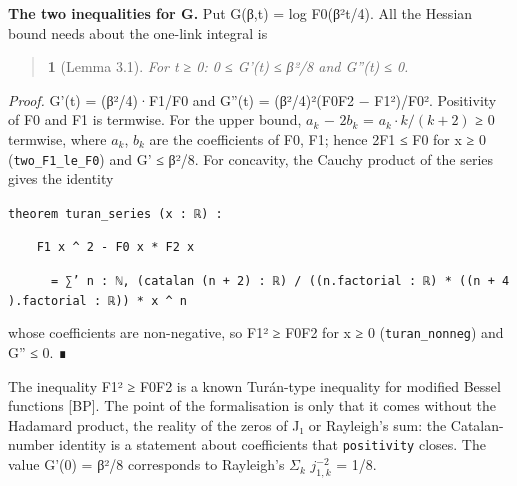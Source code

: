 \documentclass[11pt,a4paper]{article}
\theoremstyle{named}
\newtheorem*{namedthm}{}
\begin{document}
\textbf{The two inequalities for G.} Put G(β,t) = log F0(β²t/4). All the Hessian bound needs about the one-link integral is

\begin{quote}
\begin{namedthm}[Lemma 3.1]
For t ≥ 0: 0 ≤ G'(t) ≤ β²/8 and G''(t) ≤ 0.
\end{namedthm}
\end{quote}
\textit{Proof.} G'(t) = (β²/4)·F1/F0 and G''(t) = (β²/4)²(F0F2 − F1²)/F0². Positivity of F0 and F1 is termwise. For the upper bound, $a_k$ − $2b_k$ = $a_k·k/(k+2)$ ≥ 0 termwise, where $a_k$, $b_k$ are the coefficients of F0, F1; hence 2F1 ≤ F0 for x ≥ 0 (\texttt{two\_\allowbreak{}F1\_\allowbreak{}le\_\allowbreak{}F0}) and G' ≤ β²/8. For concavity, the Cauchy product of the series gives the identity

\begin{leancode}
\item \texttt{theorem\ \allowbreak{}turan\_\allowbreak{}series\ \allowbreak{}(x\ \allowbreak{}:\ \allowbreak{}ℝ)\ \allowbreak{}:}
\item \texttt{\ \allowbreak{}\ \allowbreak{}\ \allowbreak{}\ \allowbreak{}F1\ \allowbreak{}x\ \allowbreak{}\textasciicircum{}\ \allowbreak{}2\ \allowbreak{}-\ \allowbreak{}F0\ \allowbreak{}x\ \allowbreak{}*\ \allowbreak{}F2\ \allowbreak{}x}
\item \texttt{\ \allowbreak{}\ \allowbreak{}\ \allowbreak{}\ \allowbreak{}\ \allowbreak{}\ \allowbreak{}=\ \allowbreak{}∑'\ \allowbreak{}n\ \allowbreak{}:\ \allowbreak{}ℕ,\ \allowbreak{}(catalan\ \allowbreak{}(n\ \allowbreak{}+\ \allowbreak{}2)\ \allowbreak{}:\ \allowbreak{}ℝ)\ \allowbreak{}/\ \allowbreak{}((n.\allowbreak{}factorial\ \allowbreak{}:\ \allowbreak{}ℝ)\ \allowbreak{}*\ \allowbreak{}((n\ \allowbreak{}+\ \allowbreak{}4).\allowbreak{}factorial\ \allowbreak{}:\ \allowbreak{}ℝ))\ \allowbreak{}*\ \allowbreak{}x\ \allowbreak{}\textasciicircum{}\ \allowbreak{}n}
\end{leancode}
whose coefficients are non-negative, so F1² ≥ F0F2 for x ≥ 0 (\texttt{turan\_\allowbreak{}nonneg}) and G'' ≤ 0. ∎

The inequality F1² ≥ F0F2 is a known Turán-type inequality for modified Bessel functions [BP]. The point of the formalisation is only that it comes without the Hadamard product, the reality of the zeros of J₁ or Rayleigh's sum: the Catalan-number identity is a statement about coefficients that \texttt{positivity} closes. The value G'(0) = β²/8 corresponds to Rayleigh's $Σ_k$ $j_{1,k}^{−2}$ = 1/8.
\end{document}
